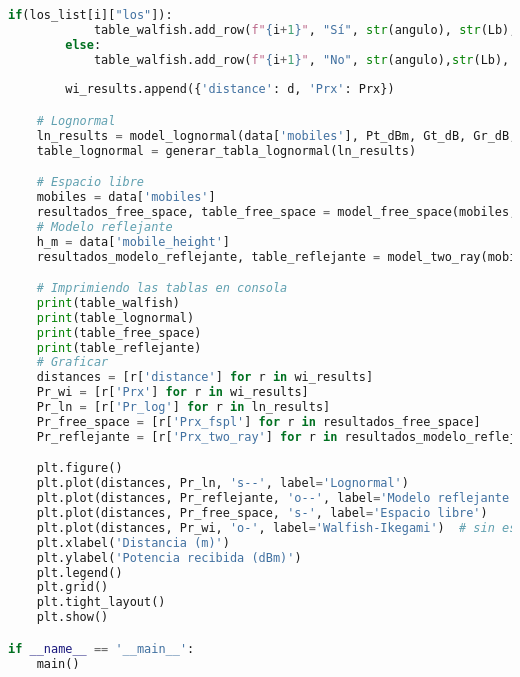 \begin{lstlisting}[language=Python, caption={main.py}]
        if(los_list[i]["los"]):
            table_walfish.add_row(f"{i+1}", "Sí", str(angulo), str(Lb), "No hay", "No hay", str(Prx))
        else: 
            table_walfish.add_row(f"{i+1}", "No", str(angulo),str(Lb), str(L_rts), str(L_msd), str(Prx))
        
        wi_results.append({'distance': d, 'Prx': Prx})

    # Lognormal
    ln_results = model_lognormal(data['mobiles'], Pt_dBm, Gt_dB, Gr_dB, alpha, sigma)
    table_lognormal = generar_tabla_lognormal(ln_results)

    # Espacio libre
    mobiles = data['mobiles']
    resultados_free_space, table_free_space = model_free_space(mobiles, FREQ_MHZ, Pt_dBm, Gt_dB, Gr_dB)
    # Modelo reflejante
    h_m = data['mobile_height']
    resultados_modelo_reflejante, table_reflejante = model_two_ray(mobiles, h_bs, h_m, FREQ_MHZ, Pt_dBm, Gt_dB, Gr_dB)

    # Imprimiendo las tablas en consola
    print(table_walfish)
    print(table_lognormal)
    print(table_free_space)
    print(table_reflejante)
    # Graficar
    distances = [r['distance'] for r in wi_results]
    Pr_wi = [r['Prx'] for r in wi_results]
    Pr_ln = [r['Pr_log'] for r in ln_results]
    Pr_free_space = [r['Prx_fspl'] for r in resultados_free_space]
    Pr_reflejante = [r['Prx_two_ray'] for r in resultados_modelo_reflejante]

    plt.figure()
    plt.plot(distances, Pr_ln, 's--', label='Lognormal')
    plt.plot(distances, Pr_reflejante, 'o--', label='Modelo reflejante')
    plt.plot(distances, Pr_free_space, 's-', label='Espacio libre')
    plt.plot(distances, Pr_wi, 'o-', label='Walfish-Ikegami')  # sin especificar color
    plt.xlabel('Distancia (m)')
    plt.ylabel('Potencia recibida (dBm)')
    plt.legend()
    plt.grid()
    plt.tight_layout()
    plt.show()

if __name__ == '__main__':
    main()
\end{lstlisting}
\clearpage
